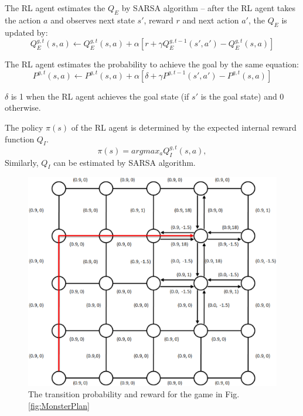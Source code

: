 The RL agent estimates the $Q_{E}$ by SARSA algorithm -- after the RL agent takes the action $a$
and observes next state $s'$, reward $r$ and next action $a'$, the $Q_{E}$ is updated by:
\begin{equation}
    Q_{E}^{g, t}(s, a) \leftarrow  Q_{E}^{g, t}(s, a) + \alpha [r + \gamma Q_{E}^{g, t-1}(s', a') - Q_{E}^{g, t}(s, a)]
\end{equation}

The RL agent estimates the probability to achieve the goal by the same equation:
\begin{equation}
    P^{g, t}(s, a) \leftarrow  P^{g, t}(s, a) + \alpha [\delta + \gamma P^{g, t-1}(s', a') - P^{g, t}(s, a)]
\end{equation}

$\delta$ is 1 when the RL agent achieves the goal state (if $s'$ is the goal state) and 0 otherwise.

The policy $\pi(s)$ of the RL agent is determined by the expected internal reward function $Q_{I}$.
\begin{equation}
    \pi(s) = argmax_a Q_{I}^{g, t}(s, a), 
\end{equation}
Similarly, $Q_{I}$ can be estimated by SARSA algorithm.

\begin{figure}[h]
    \centering
    \begin{minipage}[t]{0.9\linewidth}
        \centering
        \includegraphics[width=\textwidth] {./figures/PlanGraph.eps}
    \end{minipage}
    \caption{The transition probability and reward for the game in Fig. \ref{fig:MonsterPlan}}
    \label{fig:PlanGraph}
\end{figure}

